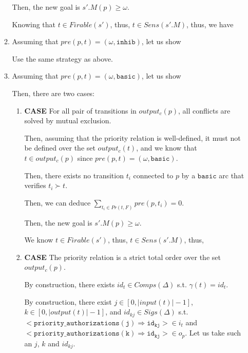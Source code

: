 \documentclass[dvipsnames,12pt]{article}
\begin{document}
\begin{niproof}
\begin{enumerate}
\begin{enumerate}
      Then, the new goal is $s'.M(p)\ge\omega$.

      Knowing that $t\in{}Firable(s')$, thus, $t\in{}Sens(s'.M)$,
      thus, we have 
      
    \item Assuming that $pre(p,t)=(\omega,\mathtt{inhib})$, let us
      show

      Use the same strategy as above.
      
    \item Assuming that $pre(p,t)=(\omega,\mathtt{basic})$, let us
      show

      Then, there are two cases:

      \begin{enumerate}
      \item \textbf{CASE} For all pair of transitions in
        $output_c(p)$, all conflicts are solved by mutual exclusion.

        Then, assuming that the priority relation is well-defined, it
        must not be defined over the set $output_c(t)$, and we know
        that $t\in{}output_c(p)$ since
        $pre(p,t)=(\omega,\mathtt{basic})$.

        Then, there exists no transition $t_i$ connected to $p$ by a
        $\mathtt{basic}$ arc that verifies $t_i\succ{}t$.

        Then, we can deduce $\sum\limits_{t_i\in{}Pr(t,F)}pre(p,t_i)=0$.
        
        Then, the new goal is $s'.M(p)\ge\omega$.

        We know $t\in{}Firable(s')$, thus, $t\in{}Sens(s'.M)$, thus,
        
      \item \textbf{CASE} The priority relation is a strict total
        order over the set $output_c(p)$.
        
        By construction, there exists $id_t\in{}Comps(\Delta)$
        s.t. $\gamma(t)=id_t$. \exT{}

        By construction, there exist
        $j\in{}[0,\vert{}input(t)\vert-1]$,
        $k\in[0,\vert{}output(t)\vert-1]$, and
        $id_{kj}\in{}Sigs(\Delta)$ s.t.
        ${<}\mathtt{priority\_authorizations(j)\Rightarrow{}id_{kj}}{>}\in{}i_t$
        and\\
        ${<}\mathtt{priority\_authorizations(k)\Rightarrow{}id_{kj}}{>}\in{}o_p$.
        Let us take such an $j$, $k$ and $id_{kj}$.


\end{enumerate}
\end{enumerate}
\end{enumerate}
\end{niproof}
\end{document}
